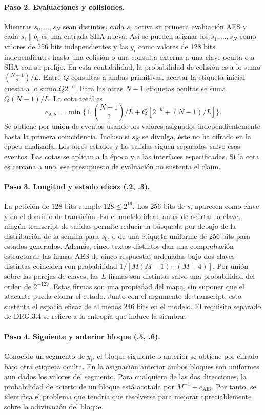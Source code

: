 \documentclass[11pt,a4paper]{article}
\begin{document}
\paragraph{Paso 2. Evaluaciones y colisiones.}
Mientras \(s_0,\ldots,s_N\) sean distintos, cada \(s_i\) activa
su primera evaluación AES y cada \(s_i\|b_i\) es una entrada SHA
nueva. Así se pueden asignar los \(s_1,\ldots,s_N\) como valores
de 256 bits independientes y las \(y_i\) como valores de 128 bits
independientes hasta una colisión o una consulta externa a una
clave oculta o a SHA con su prefijo. En esta contabilidad, la
probabilidad de colisión es a lo sumo \(\binom{N+1}{2}/L\).
Entre \(Q\) consultas a ambas primitivas, acertar la etiqueta
inicial cuesta a lo sumo \(Q2^{-h}\). Para las otras \(N-1\)
etiquetas ocultas se suma \(Q(N-1)/L\).
La cota total es
\[
   e_{\mathrm{AIS}}
   =\min\{1,\binom{N+1}{2}/L+Q[2^{-h}+(N-1)/L]\}.
\]
Se obtiene por unión de eventos usando los valores asignados
independientemente hasta la primera coincidencia. Incluso si
\(s_N\) se divulga, éste no ha cifrado en la época analizada.
Los otros estados y las salidas siguen separados salvo esos
eventos. Las cotas se aplican a la época y a las interfaces
especificadas. Si la cota es cercana a uno, ese presupuesto
de evaluación no sustenta el claim.

\paragraph{Paso 3. Longitud y estado eficaz (.2, .3).}
La petición de 128 bits cumple \(128\le2^{19}\).
Los 256 bits de \(s_i\) aparecen como clave y en el dominio
de transición. En el modelo ideal, antes de acertar la clave,
ningún transcript de salidas permite reducir la búsqueda por
debajo de la distribución de la semilla para \(s_0\), o de
una etiqueta uniforme de 256 bits para estados generados.
Además, cinco textos distintos dan una comprobación
estructural: las firmas AES de cinco respuestas ordenadas
bajo dos claves distintas coinciden con probabilidad
\(1/[M(M-1)\cdots(M-4)]\). Por unión sobre las parejas de
claves, las \(L\) firmas son distintas salvo una probabilidad
del orden de \(2^{-129}\). Estas firmas son una propiedad
del mapa, sin suponer que el atacante pueda clonar el estado.
Junto con el argumento de transcript, esto sustenta el espacio
eficaz de al menos 246 bits en el modelo. El requisito separado
de DRG.3.4 se refiere a la entropía que induce la siembra.

\paragraph{Paso 4. Siguiente y anterior bloque (.5, .6).}
Conocido un segmento de \(y_i\), el bloque siguiente o
anterior se obtiene por cifrado bajo otra etiqueta oculta.
En la asignación anterior ambos bloques son uniformes aun
dados los valores del segmento. Para cualquiera de las dos
direcciones, la probabilidad de acierto de un bloque está
acotada por \(M^{-1}+e_{\mathrm{AIS}}\). Por tanto, se
identifica el problema que tendría que resolverse para
mejorar apreciablemente sobre la adivinación del bloque.
\end{document}

